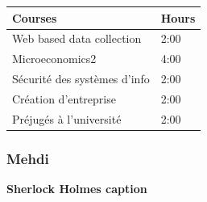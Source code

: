 \documentclass[]{article}
\begin{document}
\begin{longtable}[]{@{}ll@{}}
\toprule
\begin{minipage}[b]{0.22\columnwidth}\raggedright\strut
Courses\strut
\end{minipage} & \begin{minipage}[b]{0.22\columnwidth}\raggedright\strut
Hours\strut
\end{minipage}\tabularnewline
\midrule
\endhead
\begin{minipage}[t]{0.22\columnwidth}\raggedright\strut
Web based data collection\strut
\end{minipage} & \begin{minipage}[t]{0.22\columnwidth}\raggedright\strut
2:00\strut
\end{minipage}\tabularnewline
\begin{minipage}[t]{0.22\columnwidth}\raggedright\strut
Microeconomics2\strut
\end{minipage} & \begin{minipage}[t]{0.22\columnwidth}\raggedright\strut
4:00\strut
\end{minipage}\tabularnewline
\begin{minipage}[t]{0.22\columnwidth}\raggedright\strut
Sécurité des systèmes d'info\strut
\end{minipage} & \begin{minipage}[t]{0.22\columnwidth}\raggedright\strut
2:00\strut
\end{minipage}\tabularnewline
\begin{minipage}[t]{0.22\columnwidth}\raggedright\strut
Création d'entreprise\strut
\end{minipage} & \begin{minipage}[t]{0.22\columnwidth}\raggedright\strut
2:00\strut
\end{minipage}\tabularnewline
\begin{minipage}[t]{0.22\columnwidth}\raggedright\strut
Préjugés à l'université\strut
\end{minipage} & \begin{minipage}[t]{0.22\columnwidth}\raggedright\strut
2:00\strut
\end{minipage}\tabularnewline
\bottomrule
\end{longtable}

\subsubsection{Mehdi}\label{mehdi}

\textbf{Sherlock Holmes caption}
\end{document}
